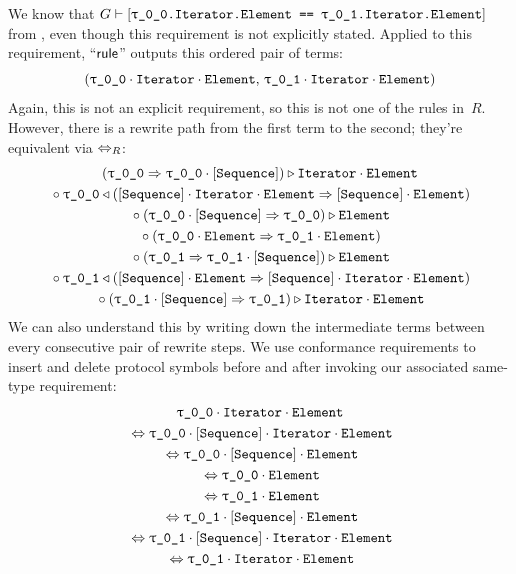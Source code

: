 \documentclass[../generics]{subfiles}
\begin{document}
\begin{example}
We know that $G\vdash\SameReq{\rT.Iterator.Element}{\rU.Iterator.Element}$ from , even though this requirement is not explicitly stated. Applied to this requirement, ``$\mathsf{rule}$'' outputs this ordered pair of terms:
\[ (\rT\cdot\nIterator\cdot\nElement,\, \rU\cdot\nIterator\cdot\nElement) \]
Again, this is not an explicit requirement, so this is not one of the rules in~$R$. However, there is a rewrite path from the first term to the second; they're equivalent via $\Leftrightarrow_R$:
\begin{gather*}
(\rT\Red\rT\cdot\pSequence)\WR\nIterator\cdot\nElement\\
{} \circ \rT\WL(\pSequence\cdot\nIterator\cdot\nElement\Red\pSequence\cdot\nElement)\\
{} \circ (\rT\cdot\pSequence\Red\rT)\WR\nElement\\
{} \circ (\rT\cdot\nElement\Red\rU\cdot\nElement)\\
{} \circ (\rU\Red\rU\cdot\pSequence)\WR\nElement\\
{} \circ \rU\WL(\pSequence\cdot\nElement\Red\pSequence\cdot\nIterator\cdot\nElement)\\
{} \circ (\rU\cdot\pSequence\Red\rU)\WR\nIterator\cdot\nElement
\end{gather*}
We can also understand this by writing down the intermediate terms between every consecutive pair of rewrite steps. We use conformance requirements to insert and delete protocol symbols before and after invoking our associated same-type requirement:
\begin{gather*}
\rT\cdot\nIterator\cdot\nElement\\
{} \Eq \rT\cdot\pSequence\cdot\nIterator\cdot\nElement\\
{} \Eq \rT\cdot\pSequence\cdot\nElement\\
{} \Eq \rT\cdot\nElement\\
{} \Eq \rU\cdot\nElement\\
{} \Eq \rU\cdot\pSequence\cdot\nElement\\
{} \Eq \rU\cdot\pSequence\cdot\nIterator\cdot\nElement\\
{} \Eq \rU\cdot\nIterator\cdot\nElement
\end{gather*}


\end{example}
\end{document}
